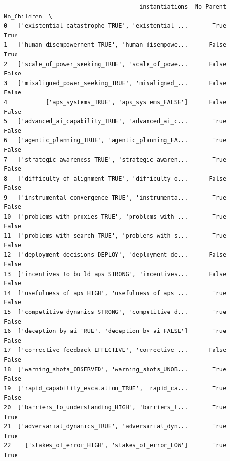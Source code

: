 \documentclass[
  11pt,
  letterpaper,
]{book}
\begin{document}
\begin{verbatim}
                                       instantiations  No_Parent  No_Children  \
0   ['existential_catastrophe_TRUE', 'existential_...       True         True   
1   ['human_disempowerment_TRUE', 'human_disempowe...      False         True   
2   ['scale_of_power_seeking_TRUE', 'scale_of_powe...      False        False   
3   ['misaligned_power_seeking_TRUE', 'misaligned_...      False        False   
4           ['aps_systems_TRUE', 'aps_systems_FALSE']      False        False   
5   ['advanced_ai_capability_TRUE', 'advanced_ai_c...       True        False   
6   ['agentic_planning_TRUE', 'agentic_planning_FA...       True        False   
7   ['strategic_awareness_TRUE', 'strategic_awaren...       True        False   
8   ['difficulty_of_alignment_TRUE', 'difficulty_o...      False        False   
9   ['instrumental_convergence_TRUE', 'instrumenta...       True        False   
10  ['problems_with_proxies_TRUE', 'problems_with_...       True        False   
11  ['problems_with_search_TRUE', 'problems_with_s...       True        False   
12  ['deployment_decisions_DEPLOY', 'deployment_de...      False        False   
13  ['incentives_to_build_aps_STRONG', 'incentives...      False        False   
14  ['usefulness_of_aps_HIGH', 'usefulness_of_aps_...       True        False   
15  ['competitive_dynamics_STRONG', 'competitive_d...       True        False   
16  ['deception_by_ai_TRUE', 'deception_by_ai_FALSE']       True        False   
17  ['corrective_feedback_EFFECTIVE', 'corrective_...      False        False   
18  ['warning_shots_OBSERVED', 'warning_shots_UNOB...       True        False   
19  ['rapid_capability_escalation_TRUE', 'rapid_ca...       True        False   
20  ['barriers_to_understanding_HIGH', 'barriers_t...       True         True   
21  ['adversarial_dynamics_TRUE', 'adversarial_dyn...       True         True   
22    ['stakes_of_error_HIGH', 'stakes_of_error_LOW']       True         True   


\end{verbatim}
\end{document}
